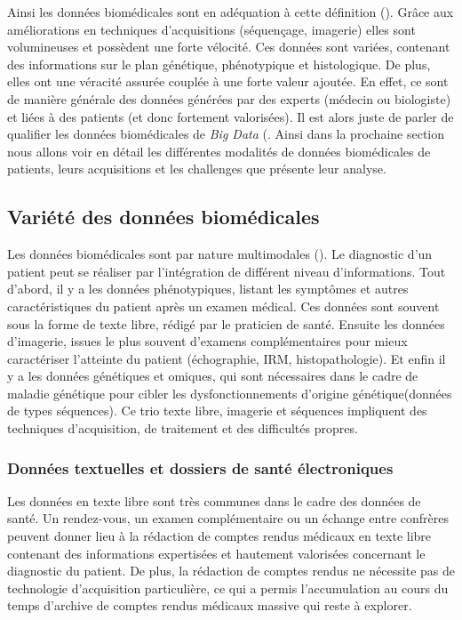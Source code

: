 Ainsi les données biomédicales sont en adéquation à cette définition (\cite{zheng_application_2021}). Grâce aux améliorations en techniques d'acquisitions (séquençage, imagerie) elles sont volumineuses et possèdent une forte vélocité. Ces données sont variées, contenant des informations sur le plan génétique, phénotypique et histologique. De plus, elles ont une véracité assurée couplée à une forte valeur ajoutée. En effet, ce sont de manière générale des données générées par des experts (médecin ou biologiste) et liées à des patients (et donc fortement valorisées). Il est alors juste de parler de qualifier les données biomédicales de \textit{Big Data} (\cite{sonawane_network_2019}. Ainsi dans la prochaine section nous allons voir en détail les différentes modalités de données biomédicales de patients, leurs acquisitions et les challenges que présente leur analyse.

\subsection{Variété des données biomédicales}
Les données biomédicales sont par nature multimodales (\cite{acosta_multimodal_2022}). Le diagnostic d'un patient peut se réaliser par l'intégration de différent niveau d'informations. Tout d'abord, il y a les données phénotypiques, listant les symptômes et autres caractéristiques du patient après un examen médical. Ces données sont souvent sous la forme de texte libre, rédigé par le praticien de santé. Ensuite les données d'imagerie, issues le plus souvent d'examens complémentaires pour mieux caractériser l'atteinte du patient (échographie, IRM, histopathologie). Et enfin il y a les données génétiques et omiques, qui sont nécessaires dans le cadre de maladie génétique pour cibler les dysfonctionnements d'origine génétique(données de types séquences). Ce trio texte libre, imagerie et séquences impliquent des techniques d'acquisition, de traitement et des difficultés propres.

\subsubsection{Données textuelles et dossiers de santé électroniques}
Les données en texte libre sont très communes dans le cadre des données de santé. Un rendez-vous, un examen complémentaire ou un échange entre confrères peuvent donner lieu à la rédaction de comptes rendus médicaux en texte libre contenant des informations expertisées et hautement valorisées concernant le diagnostic du patient. De plus, la rédaction de comptes rendus ne nécessite pas de technologie d'acquisition particulière, ce qui a permis l'accumulation au cours du temps d'archive de comptes rendus médicaux massive qui reste à explorer.

